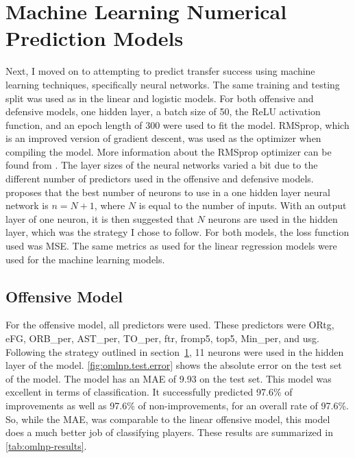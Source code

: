 \documentclass[12pt]{article}
\begin{document}
\section{Machine Learning Numerical Prediction Models}
\label{sec:mlnp}
Next, I moved on to attempting to predict transfer success using machine learning techniques, specifically neural networks. The same training and testing split was used as in the linear and logistic models. For both offensive and defensive models, one hidden layer, a batch size of 50, the ReLU activation function, and an epoch length of 300 were used to fit the model. RMSprop, which is an improved version of gradient descent, was used as the optimizer when compiling the model. More information about the RMSprop optimizer can be found from \citet{rmsprop}. The layer sizes of the neural networks varied a bit due to the different number of predictors used in the offensive and defensive models. \citet{hunter2012selection} proposes that the best number of neurons to use in a one hidden layer neural network is \(n = N + 1\), where \(N\) is equal to the number of inputs. With an output layer of one neuron, it is then suggested that \(N\) neurons are used in the hidden layer, which was the strategy I chose to follow. For both models, the loss function used was MSE. The same metrics as used for the linear regression models were used for the machine learning models.

\subsection{Offensive Model}
\label{subsec:omlnp}
For the offensive model, all predictors were used. These predictors were ORtg, eFG, ORB\_per, AST\_per, TO\_per, ftr, fromp5, top5, Min\_per, and usg. Following the strategy outlined in section~\ref{sec:mlnp}, 11 neurons were used in the hidden layer of the model. \autoref{fig:omlnp.test.error} shows the absolute error on the test set of the model. The model has an MAE of 9.93 on the test set. This model was excellent in terms of classification. It successfully predicted 97.6\% of improvements as well as 97.6\% of non-improvements, for an overall rate of 97.6\%. So, while the MAE, was comparable to the linear offensive model, this model does a much better job of classifying players. These results are summarized in \autoref{tab:omlnp-results}.
\end{document}

